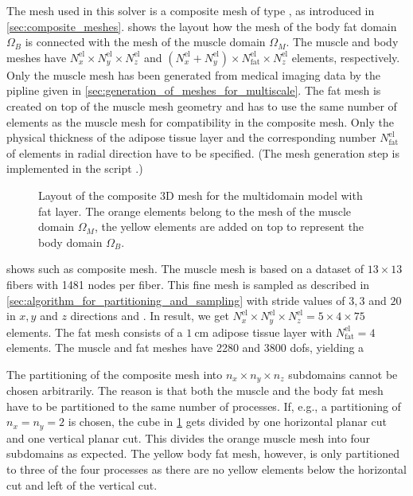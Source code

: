 The mesh used in this solver is a composite mesh of type , as introduced in \cref{sec:composite_meshes}.  shows the layout how the mesh of the body fat domain $\Omega_B$ is connected with the mesh of the muscle domain $\Omega_M$. The muscle and body meshes have $N_x^\text{el} \times N_y^\text{el} \times N_z^\text{el}$ and $(N_x^\text{el}+ N_y^\text{el}) \times N_\text{fat}^\text{el} \times N_z^\text{el}$ elements, respectively. Only the muscle mesh has been generated from medical imaging data by the pipline given in \cref{sec:generation_of_meshes_for_multiscale}. The fat mesh is created on top of the muscle mesh geometry and has to use the same number of elements as the muscle mesh for compatibility in the composite mesh. Only the physical thickness of the adipose tissue layer and the corresponding number $N_\text{fat}^\text{el}$ of elements in radial direction have to be specified.  (The mesh generation step is implemented in the script .) 

\begin{figure}
  \centering%
  \def\svgwidth{0.6\textwidth}
  \caption{Layout of the composite 3D mesh for the multidomain model with fat layer. The orange elements belong to the mesh of the muscle domain $\Omega_M$, the yellow elements are added on top to represent the body domain $\Omega_B$.}%
  \label{fig:structured_grid_n_nodes}%
\end{figure}%

 shows such as composite mesh.
The muscle mesh is based on a dataset of $13\times 13$ fibers with \num{1481} nodes per fiber. This fine mesh is sampled as described in \cref{sec:algorithm_for_partitioning_and_sampling} with stride values of $3,3$ and $20$ in $x,y$ and $z$ directions and . In result, we get $N_x^\text{el} \times N_y^\text{el} \times N_z^\text{el} = 5 \times 4 \times 75$ elements.
The fat mesh consists of a $\SI{1}{\centi\meter}$ adipose tissue layer with $N_\text{fat}^\text{el}=4$ elements. The muscle and fat meshes have \num{2280} and \num{3800} dofs, yielding a 

The partitioning of the composite mesh into $n_x \times n_y \times n_z$ subdomains cannot be chosen arbitrarily. The reason is that both the muscle and the body fat mesh have to be partitioned to the same number of processes. 
If, e.g., a partitioning of $n_x=n_y=2$ is chosen, the cube in \cref{fig:structured_grid_n_nodes} gets divided by one horizontal planar cut and one vertical planar cut. This divides the orange muscle mesh into four subdomains as expected. The yellow body fat mesh, however, is only partitioned to three of the four processes as there are no yellow elements below the horizontal cut and left of the vertical cut.

